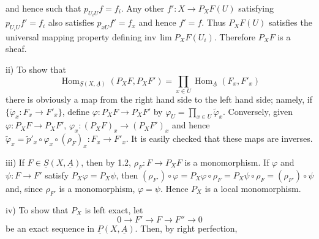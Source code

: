and hence such that $p_{U_iU}f=f_i$. Any other $f':X\longrightarrow P_XF(U)$ satisfying $p_{U_iU}f'=f_i$ also satisfies $p_{xU}f'=f_x$ and hence $f'=f$. Thus $P_XF(U)$ satisfies the universal mapping property defining $\mathrm{inv}\,\lim P_XF(U_i)$. Therefore $P_XF$ is a sheaf.

ii) To show that
\[
\operatorname{Hom}_{\underline{S}(X,\underline{A})}(P_XF,P_XF')=\prod_{x\in U}\operatorname{Hom}_{\underline{A}}(F_x,F'_x)
\]
there is obviously a map from the right hand side to the left hand side; namely, if $\{\widetilde{\varphi}_x:F_x\longrightarrow F'_x\}$, define $\varphi:P_XF\longrightarrow P_XF'$ by $\varphi_U=\prod_{x\in U}\widetilde{\varphi}_x$. Conversely, given $\varphi:P_XF\longrightarrow P_XF'$, $\varphi_x:(P_XF)_x\longrightarrow(P_XF')_x$ and hence $\widetilde{\varphi}_x=\widetilde{p}'_x\circ\varphi_x\circ(\rho_F)_x:F_x\longrightarrow F'_x$. It is easily checked that these maps are inverses.

iii) If $F\in\underline{S}(X,\underline{A})$, then by 1.2, $\rho_F:F\longrightarrow P_XF$ is a monomorphism. If $\varphi$ and $\psi:F\longrightarrow F'$ satisfy $P_X\varphi=P_X\psi$, then $(\rho_{F'})\circ\varphi=P_X\varphi\circ\rho_F=P_X\psi\circ\rho_F=(\rho_{F'})\circ\psi$ and, since $\rho_{F'}$ is a monomorphism, $\varphi=\psi$. Hence $P_X$ is a local monomorphism.

iv) To show that $P_X$ is left exact, let
\[
0\longrightarrow F'\longrightarrow F\longrightarrow F''\longrightarrow0
\]
be an exact sequence in $\underline{P}(X,\underline{A})$. Then, by right perfection,

